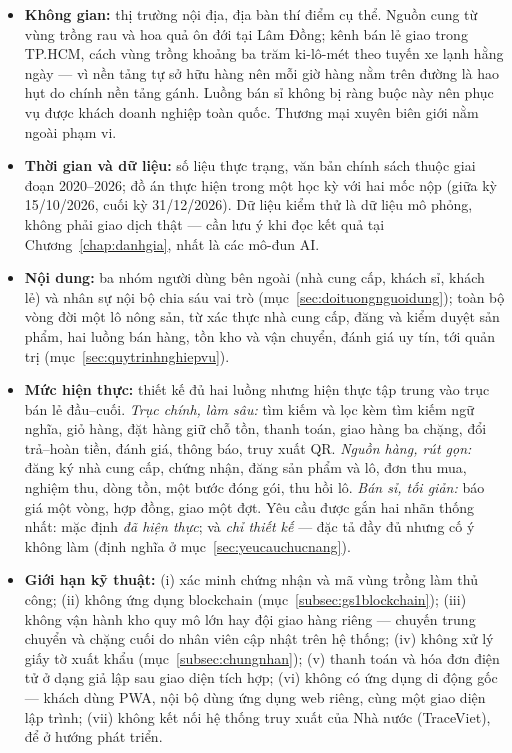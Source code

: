 \begin{itemize}
    \item \textbf{Không gian:} thị trường nội địa, địa bàn thí điểm cụ thể. Nguồn cung từ vùng trồng rau và hoa quả ôn đới tại Lâm Đồng; kênh bán lẻ giao trong TP.HCM, cách vùng trồng khoảng ba trăm ki-lô-mét theo tuyến xe lạnh hằng ngày --- vì nền tảng tự sở hữu hàng nên mỗi giờ hàng nằm trên đường là hao hụt do chính nền tảng gánh. Luồng bán sỉ không bị ràng buộc này nên phục vụ được khách doanh nghiệp toàn quốc. Thương mại xuyên biên giới nằm ngoài phạm vi.
    \item \textbf{Thời gian và dữ liệu:} số liệu thực trạng, văn bản chính sách thuộc giai đoạn 2020--2026; đồ án thực hiện trong một học kỳ với hai mốc nộp (giữa kỳ 15/10/2026, cuối kỳ 31/12/2026). Dữ liệu kiểm thử là dữ liệu mô phỏng, không phải giao dịch thật --- cần lưu ý khi đọc kết quả tại Chương~\ref{chap:danhgia}, nhất là các mô-đun AI.
    \item \textbf{Nội dung:} ba nhóm người dùng bên ngoài (nhà cung cấp, khách sỉ, khách lẻ) và nhân sự nội bộ chia sáu vai trò (mục~\ref{sec:doituongnguoidung}); toàn bộ vòng đời một lô nông sản, từ xác thực nhà cung cấp, đăng và kiểm duyệt sản phẩm, hai luồng bán hàng, tồn kho và vận chuyển, đánh giá uy tín, tới quản trị (mục~\ref{sec:quytrinhnghiepvu}).
    \item \textbf{Mức hiện thực:} thiết kế đủ hai luồng nhưng hiện thực tập trung vào trục bán lẻ đầu--cuối. \emph{Trục chính, làm sâu:} tìm kiếm và lọc kèm tìm kiếm ngữ nghĩa, giỏ hàng, đặt hàng giữ chỗ tồn, thanh toán, giao hàng ba chặng, đổi trả--hoàn tiền, đánh giá, thông báo, truy xuất QR. \emph{Nguồn hàng, rút gọn:} đăng ký nhà cung cấp, chứng nhận, đăng sản phẩm và lô, đơn thu mua, nghiệm thu, dòng tồn, một bước đóng gói, thu hồi lô. \emph{Bán sỉ, tối giản:} báo giá một vòng, hợp đồng, giao một đợt. Yêu cầu được gắn hai nhãn thống nhất: mặc định \emph{đã hiện thực}; và \emph{chỉ thiết kế} --- đặc tả đầy đủ nhưng cố ý không làm (định nghĩa ở mục~\ref{sec:yeucauchucnang}).
    \item \textbf{Giới hạn kỹ thuật:} (i) xác minh chứng nhận và mã vùng trồng làm thủ công; (ii) không ứng dụng blockchain (mục~\ref{subsec:gs1blockchain}); (iii) không vận hành kho quy mô lớn hay đội giao hàng riêng --- chuyến trung chuyển và chặng cuối do nhân viên cập nhật trên hệ thống; (iv) không xử lý giấy tờ xuất khẩu (mục~\ref{subsec:chungnhan}); (v) thanh toán và hóa đơn điện tử ở dạng giả lập sau giao diện tích hợp; (vi) không có ứng dụng di động gốc --- khách dùng PWA, nội bộ dùng ứng dụng web riêng, cùng một giao diện lập trình; (vii) không kết nối hệ thống truy xuất của Nhà nước (TraceViet), để ở hướng phát triển.
\end{itemize}

